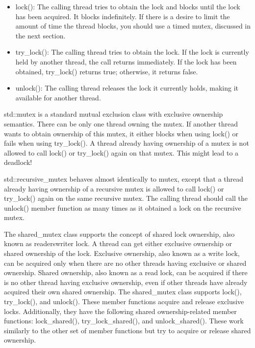 \begin{itemize}
\item
lock(): The calling thread tries to obtain the lock and blocks until the lock has been acquired. It blocks indefinitely. If there is a desire to limit the amount of time the thread blocks, you should use a timed mutex, discussed in the next section.

\item
try\_lock(): The calling thread tries to obtain the lock. If the lock is currently held by another thread, the call returns immediately. If the lock has been obtained, try\_lock() returns true; otherwise, it returns false.

\item
unlock(): The calling thread releases the lock it currently holds, making it available for another thread.
\end{itemize}

std::mutex is a standard mutual exclusion class with exclusive ownership semantics. There can be only one thread owning the mutex. If another thread wants to obtain ownership of this mutex, it either blocks when using lock() or fails when using try\_lock(). A thread already having ownership of a mutex is not allowed to call lock() or try\_lock() again on that mutex. This might lead to a deadlock!

std::recursive\_mutex behaves almost identically to mutex, except that a thread already having ownership of a recursive mutex is allowed to call lock() or try\_lock() again on the same recursive mutex. The calling thread should call the unlock() member function as many times as it obtained a lock on the recursive mutex.

The shared\_mutex class supports the concept of shared lock ownership, also known as readerswriter lock. A thread can get either exclusive ownership or shared ownership of the lock. Exclusive ownership, also known as a write lock, can be acquired only when there are no other threads having exclusive or shared ownership. Shared ownership, also known as a read lock, can be acquired if there is no other thread having exclusive ownership, even if other threads have already acquired their own shared ownership. The shared\_mutex class supports lock(), try\_lock(), and unlock(). These member functions acquire and release exclusive locks. Additionally, they have the following shared ownership-related member functions: lock\_shared(), try\_lock\_shared(), and unlock\_shared(). These work similarly to the other set of member functions but try to acquire or release shared ownership.

